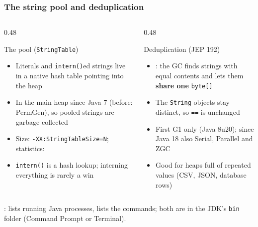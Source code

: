 \documentclass[aspectratio=169,10pt,compress]{beamer}
\begin{document}
\begin{frame}[t,fragile] \frametitle{The string pool and deduplication}
  \begin{columns}[T]
    \begin{column}{0.48\textwidth}
      \begin{block}{The pool (\texttt{StringTable})}
        \small
        \begin{itemize}
          \item Literals and \texttt{intern()}ed strings live in a native hash table pointing into the heap
          \item In the main heap since Java 7 (before: PermGen), so pooled strings are garbage collected
          \item Size: \texttt{-XX:StringTableSize=N}; statistics: 
          \item \texttt{intern()} is a hash lookup; interning everything is rarely a win
        \end{itemize}
      \end{block}
    \end{column}
    \begin{column}{0.48\textwidth}
      \begin{block}{Deduplication (JEP 192)}
        \small
        \begin{itemize}
          \item {}: the GC finds strings with equal contents and lets them
                \textbf{share one} \texttt{byte[]}
          \item The \texttt{String} objects stay distinct, so \texttt{==} is unchanged
          \item First G1 only (Java 8u20); since Java 18 also Serial, Parallel and ZGC
          \item Good for heaps full of repeated values (CSV, JSON, database rows)
        \end{itemize}
      \end{block}
    \end{column}
  \end{columns}
  \vspace{0.2em}
  \small {}:  lists running Java processes,  lists the commands;
  both are in the JDK's \texttt{bin} folder (Command Prompt or Terminal).
\end{frame}
\end{document}
